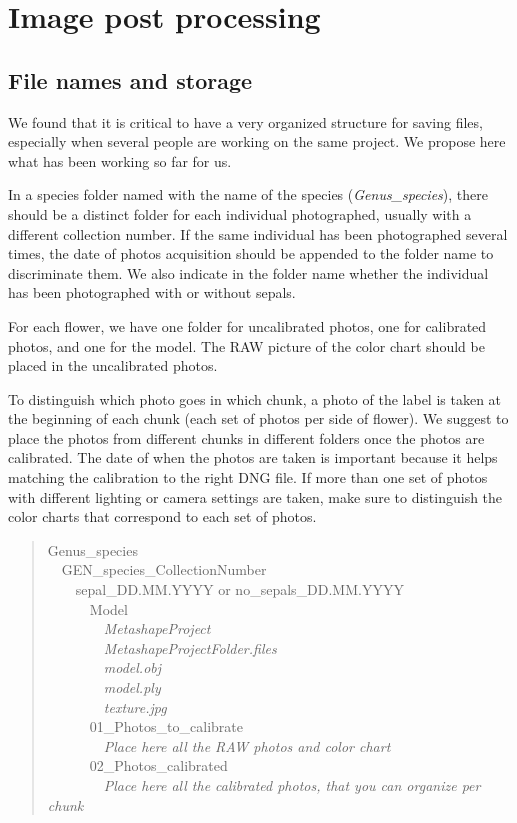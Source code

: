 \documentclass[
]{book}
\begin{document}
\hypertarget{image-post-processing}{%
\chapter{Image post processing}\label{image-post-processing}}

\hypertarget{file-names-and-storage}{%
\section{File names and storage}\label{file-names-and-storage}}

We found that it is critical to have a very organized structure for
saving files, especially when several people are working on the same
project. We propose here what has been working so far for us.

In a species folder named with the name of the species
(\emph{Genus\_species}), there should be a distinct folder for each individual
photographed, usually with a different collection number. If the same
individual has been photographed several times, the date of photos
acquisition should be appended to the folder name to discriminate them.
We also indicate in the folder name whether the individual has been
photographed with or without sepals.

For each flower, we have one folder for uncalibrated photos, one for
calibrated photos, and one for the model. The RAW picture of the color chart
should be placed in the uncalibrated photos.

To distinguish which photo goes in which chunk, a photo of the label is
taken at the beginning of each chunk (each set of photos per side of
flower). We suggest to place the photos from different chunks in
different folders once the photos are calibrated. The date of when the
photos are taken is important because it helps matching the calibration
to the right DNG file. If more than one set of photos with different
lighting or camera settings are taken, make sure to distinguish the
color charts that correspond to each set of photos.

\begin{quote}
Genus\_species\\
 GEN\_species\_CollectionNumber\\
  sepal\_DD.MM.YYYY or no\_sepals\_DD.MM.YYYY\\
   Model\\
    \emph{MetashapeProject}\\
    \emph{MetashapeProjectFolder.files}\\
    \emph{model.obj}\\
    \emph{model.ply}\\
    \emph{texture.jpg}\\
   01\_Photos\_to\_calibrate\\
    \emph{Place here all the RAW photos and color chart}\\
   02\_Photos\_calibrated\\
    \emph{Place here all the calibrated photos, that you can organize per chunk}\\
\end{quote}
\end{document}

